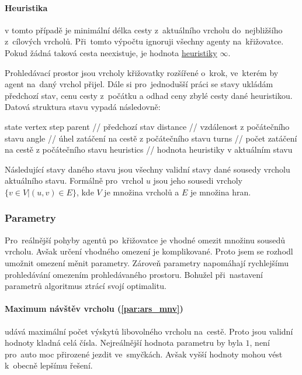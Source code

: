 \paragraph{Heuristika}\label{par:ars_heuristika} v tomto případě je minimální délka cesty
z~aktuálního vrcholu do~nejbližšího z~cílových vrcholů.
Při~tomto výpočtu ignoruji všechny agenty na~křižovatce.
Pokud žádná taková cesta neexistuje, je hodnota \hyperref[par:ars_heuristika]{heuristiky} $\infty$.

Prohledávací prostor jsou vrcholy křižovatky rozšířené o~krok, ve~kterém by agent na~daný vrchol přijel.
Dále si pro~jednodušší práci se stavy ukládám předchozí stav,
cenu cesty z~počátku a odhad ceny zbylé cesty dané heuristikou.
Datová struktura stavu vypadá následovně:
\begin{code}[frame=none]
state {
  vertex
  step
  parent      // předchozí stav
  distance    // vzdálenost z počátečního stavu
  angle       // úhel zatáčení na cestě z počátečního stavu
  turns       // počet zatáčení na cestě z počátečního stavu
  heuristics  // hodnota heuristiky v aktuálním stavu
}
\end{code}

Následující stavy daného stavu jsou všechny validní stavy dané sousedy vrcholu aktuálního stavu.
Formálně pro~vrchol $u$ jsou jeho sousedi vrcholy $\{v \in V | (u,v)\in E\}$,
kde $V$ je množina vrcholů a $E$ je množina hran.

\subsubsection{Parametry}\label{subsubsec:ars_parametry}
Pro~reálnější pohyby agentů po~křižovatce je vhodné omezit množinu sousedů vrcholu.
Avšak určení vhodného omezení je komplikované.
Proto jsem se rozhodl umožnit omezení měnit parametry.
Zároveň parametry napomáhají rychlejšímu prohledávání omezením prohledávaného prostoru.
Bohužel při~nastavení parametrů algoritmus ztrácí svojí optimalitu.

\paragraph{Maximum návštěv vrcholu (\ref{par:ars_mnv})}
udává maximální počet výskytů libovolného vrcholu na~cestě.
Proto jsou validní hodnoty kladná celá čísla.
Nejreálnější hodnota parametru by byla $1$, není pro~auto moc přirozené jezdit ve~smyčkách.
Avšak vyšší hodnoty mohou vést k~obecně lepšímu řešení.

